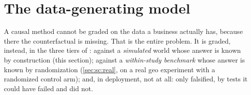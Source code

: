 \section{The data-generating model}
\label{sec:sc:dgm}

A causal method cannot be graded on the data a business actually has, because there the
counterfactual is missing. That is the entire problem. It is graded, instead, in the three
tiers of : against a \emph{simulated} world whose answer is known by
construction (this section); against a \emph{within-study benchmark} whose answer is known by
randomization (\cref{sec:sc:real}, on a real geo experiment with a randomized control arm); and,
in deployment, not at all: only falsified, by tests it could have failed and did not.

